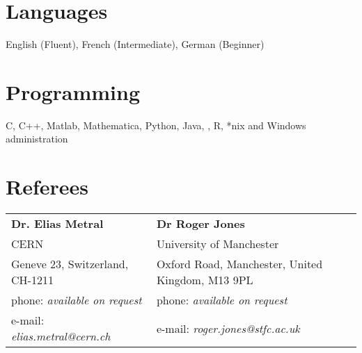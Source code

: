 \documentclass[margin,line]{resume}
\begin{document}
\begin{resume}
    \section{\mysidestyle Languages} 

   English (Fluent), French (Intermediate), German (Beginner)


    \section{\mysidestyle Programming} 

    C, C++, Matlab, Mathematica, Python, Java, \LaTeXe, R, *nix and Windows administration






\section{\mysidestyle Referees} 

\begin{tabular}{@{}p{6cm}p{6cm}}
\textbf{Dr. Elias Metral}       &  \textbf{Dr Roger Jones}                   \\
CERN                     &  University of Manchester                      \\
Geneve 23, Switzerland, CH-1211           &  Oxford Road, Manchester, United Kingdom, M13 9PL        \\
phone: \textsl{available on request}    &  phone: \textsl{available on request}     \\
e-mail: \textsl{elias.metral@cern.ch}   &  e-mail: \textsl{roger.jones@stfc.ac.uk}    \\
\end{tabular}


\end{resume}
\end{document}
